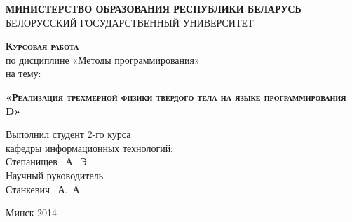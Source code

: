\begin{titlepage}
\newpage

\begin{center}
\textsc{\textbf{МИНИСТЕРСТВО ОБРАЗОВАНИЯ РЕСПУБЛИКИ БЕЛАРУСЬ}} \\
\vspace{1cm}
БЕЛОРУССКИЙ ГОСУДАРСТВЕННЫЙ УНИВЕРСИТЕТ \\
\end{center}
 
\vspace{8em}

\begin{center}
\Large \textsc{\textbf{Курсовая работа}} \\
по дисциплине  «Методы программирования» \\
на тему:
\end{center}

\vspace{2.5em}
 
\begin{center}
\textsc{\textbf{«Реализация трехмерной физики твёрдого тела \linebreak на языке программирования D»}}
\end{center}

\vspace{12em}
 
\begin{flushleft}
Выполнил студент 2-го курса \\
кафедры информационных технологий: \\
Степанищев ~А.~Э. \\
\vspace{1.5em}
Научный руководитель \\
Станкевич ~А.~А.\\
\vspace{1.5em}
\end{flushleft}
 
\vspace{\fill}

\begin{center}
Минск 2014
\end{center}

\end{titlepage}